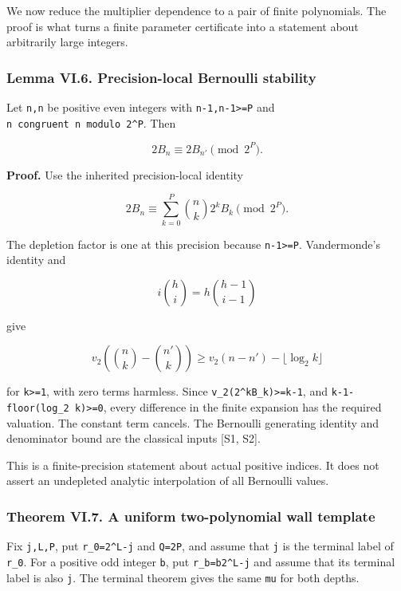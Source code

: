 \documentclass[11pt,letterpaper]{article}
\begin{document}
We now reduce the multiplier dependence to a pair of finite polynomials. The proof is what turns a finite parameter certificate into a statement about arbitrarily large integers.

\subsubsection{Lemma VI.6. Precision-local Bernoulli stability}\label{lemma-vi.6.-precision-local-bernoulli-stability}

Let \texttt{n,n\textquotesingle{}} be positive even integers with \texttt{n-1,n\textquotesingle{}-1\textgreater{}=P} and \texttt{n\ congruent\ n\textquotesingle{}\ modulo\ 2\^{}P}. Then

\[
2B_n\equiv2B_{n'}\pmod{2^P}.
\]

\textbf{Proof.} Use the inherited precision-local identity

\[
2B_n\equiv\sum_{k=0}^{P}\binom nk2^kB_k\pmod{2^P}.
\]

The depletion factor is one at this precision because \texttt{n-1\textgreater{}=P}. Vandermonde's identity and

\[
i\binom hi=h\binom{h-1}{i-1}
\]

give

\[
v_2\left(\binom nk-\binom{n'}k\right)
\ge v_2(n-n')-\lfloor\log_2k\rfloor
\]

for \texttt{k\textgreater{}=1}, with zero terms harmless. Since \texttt{v\_2(2\^{}kB\_k)\textgreater{}=k-1}, and \texttt{k-1-floor(log\_2\ k)\textgreater{}=0}, every difference in the finite expansion has the required valuation. The constant term cancels. The Bernoulli generating identity and denominator bound are the classical inputs {[}S1, S2{]}.

This is a finite-precision statement about actual positive indices. It does not assert an undepleted analytic interpolation of all Bernoulli values.

\subsubsection{Theorem VI.7. A uniform two-polynomial wall template}\label{theorem-vi.7.-a-uniform-two-polynomial-wall-template}

Fix \texttt{j,L,P}, put \texttt{r\_0=2\^{}L-j} and \texttt{Q=2P}, and assume that \texttt{j} is the terminal label of \texttt{r\_0}. For a positive odd integer \texttt{b}, put \texttt{r\_b=b2\^{}L-j} and assume that its terminal label is also \texttt{j}. The terminal theorem gives the same \texttt{mu} for both depths.
\end{document}
